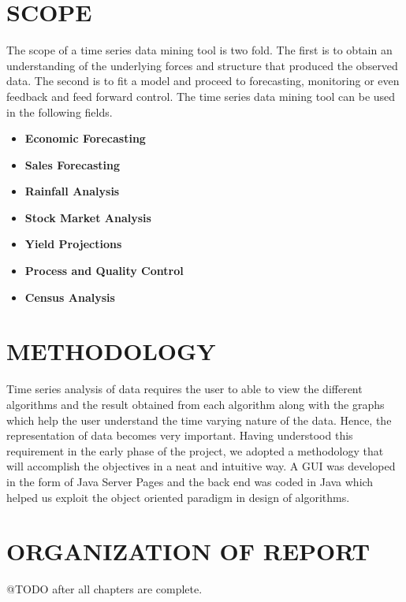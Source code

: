 \documentclass[12pt]{report}
\begin{document}
\section{SCOPE}
The scope of a time series data mining tool is two fold. The first  is to obtain an understanding of the underlying forces and structure that produced the observed data. The second is to 
fit a model and proceed to forecasting, monitoring or even feedback and feed forward control. The time series data mining tool can be used in the following fields. 
\begin{itemize}
\item{\textbf{Economic Forecasting}}
\item{\textbf{Sales Forecasting}}
\item{\textbf{Rainfall Analysis}}
\item{\textbf{Stock Market Analysis}}
\item{\textbf{Yield Projections}}
\item{\textbf{Process and Quality Control}}
\item{\textbf{Census Analysis}}
\end{itemize}
\section{METHODOLOGY}
Time series analysis of data requires the user to able to view the different algorithms and the result obtained from each algorithm along with the graphs which help the user understand the time varying nature of the data. Hence, the representation of data becomes very important. Having understood this requirement in the early phase of the project, we adopted a methodology that will accomplish the objectives in a neat and intuitive way. A GUI was developed in the form of Java Server Pages and the back end was coded in Java which helped us exploit the object oriented paradigm in design of algorithms. 

\section{ORGANIZATION OF REPORT}
@TODO after all chapters are complete.

\pagestyle{fancy}
\chead{}
\rfoot{\small{\thepage}}
\renewcommand{\headrulewidth}{0.4pt}
\renewcommand{\footrulewidth}{0.4pt}
\end{document}
